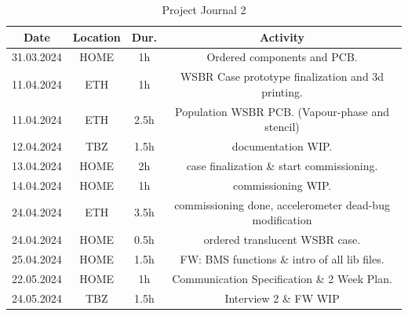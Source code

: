\begin{table}[H]
    \centering
\begin{tabular}{||c | c | c || c||} 
 \hline
 Date &  Location & Dur. & Activity \\ [0.5ex] 
 \hline\hline
     31.03.2024 & HOME & 1h & Ordered components and PCB. \\ 
 \hline
     11.04.2024 & ETH & 1h & WSBR Case prototype finalization and 3d printing. \\ 
 \hline
     11.04.2024 & ETH & 2.5h & Population WSBR PCB. (Vapour-phase and stencil)\\ 
 \hline
     12.04.2024 & TBZ & 1.5h & documentation WIP. \\ 
 \hline
     13.04.2024 & HOME & 2h & case finalization \& start commissioning. \\ 
 \hline
     14.04.2024 & HOME & 1h & commissioning WIP. \\ 
 \hline
     24.04.2024 & ETH & 3.5h & commissioning done, accelerometer dead-bug modification \\ 
 \hline
     24.04.2024 & HOME & 0.5h & ordered translucent WSBR case. \\ 
 \hline
     25.04.2024 & HOME & 1.5h & FW: BMS functions \& intro of all lib files. \\ 
 \hline
     22.05.2024 & HOME & 1h & Communication Specification \& 2 Week Plan. \\ 
 \hline
     24.05.2024 & TBZ & 1.5h & Interview 2 \& FW WIP \\ 
 \hline
\end{tabular}
    \caption{Project Journal 2}
    \label{tab:Project Journal 2}
\end{table}
